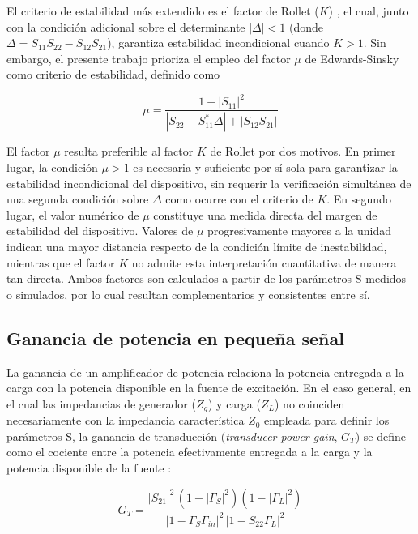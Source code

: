 El criterio de estabilidad más extendido es el factor de Rollet ($K$) \cite{rollet1962}, el cual, junto con la condición adicional sobre el determinante $|\Delta| < 1$ (donde $\Delta = S_{11}S_{22} - S_{12}S_{21}$), garantiza estabilidad incondicional cuando $K > 1$. Sin embargo, el presente trabajo prioriza el empleo del factor $\mu$ de Edwards-Sinsky como criterio de estabilidad, definido como \cite{edwards1992}

\begin{equation}
    \mu = \frac{1 - |S_{11}|^2}{|S_{22} - S_{11}^{*}\Delta| + |S_{12}S_{21}|}
    \label{eq:mu_factor}
\end{equation}

El factor $\mu$ resulta preferible al factor $K$ de Rollet por dos motivos. En primer lugar, la condición $\mu > 1$ es necesaria y suficiente por sí sola para garantizar la estabilidad incondicional del dispositivo, sin requerir la verificación simultánea de una segunda condición sobre $\Delta$ como ocurre con el criterio de $K$. En segundo lugar, el valor numérico de $\mu$ constituye una medida directa del margen de estabilidad del dispositivo. Valores de $\mu$ progresivamente mayores a la unidad indican una mayor distancia respecto de la condición límite de inestabilidad, mientras que el factor $K$ no admite esta interpretación cuantitativa de manera tan directa. Ambos factores son calculados a partir de los parámetros S medidos o simulados, por lo cual resultan complementarios y consistentes entre sí.

\subsection{Ganancia de potencia en pequeña señal}
La ganancia de un amplificador de potencia relaciona la potencia entregada a la carga con la potencia disponible en la fuente de excitación. En el caso general, en el cual las impedancias de generador ($Z_g$) y carga ($Z_L$) no coinciden necesariamente con la impedancia característica $Z_0$ empleada para definir los parámetros S, la ganancia de transducción (\textit{transducer power gain}, $G_T$) se define como el cociente entre la potencia efectivamente entregada a la carga y la potencia disponible de la fuente \cite[p.~561]{pozar2011}:

\begin{equation}
    G_T = \frac{|S_{21}|^2\,(1-|\Gamma_S|^2)(1-|\Gamma_L|^2)}{|1-\Gamma_S\Gamma_{in}|^2\,|1-S_{22}\Gamma_L|^2}
    \label{eq:ganancia_transductora}
\end{equation}


